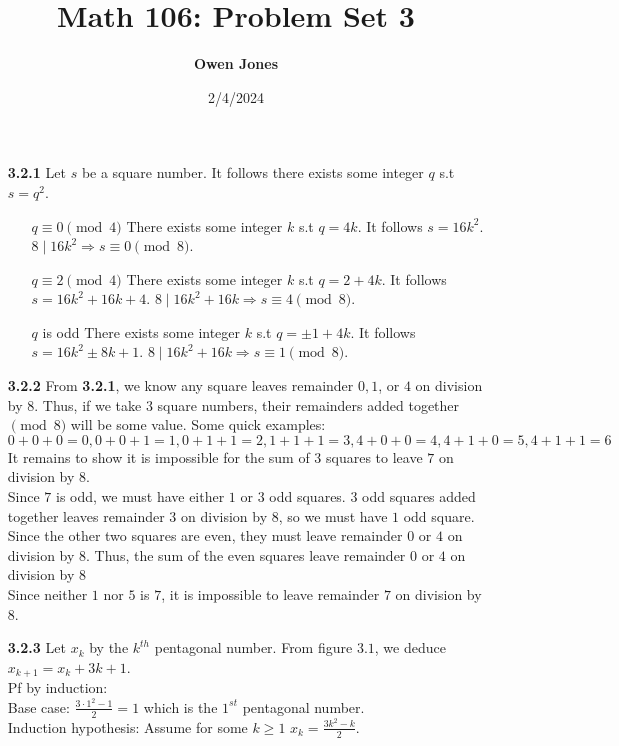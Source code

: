 \documentclass[10pt]{article}
\title{\bf Math 106: Problem Set 3}
\date{2/4/2024}
\author{\bf Owen Jones}
\begin{document}
\maketitle
\begin{enumerate}
    \item [\textbf{3.2.1}] Let $s$ be a square number.
    It follows there exists some integer $q$ s.t $s=q^2$.
    \begin{itemize}
        \item [$q\equiv 0\pmod{4}$] There exists some integer $k$ s.t $q=4k$. It follows $s=16k^2$. $8\mid 16k^2\Rightarrow s\equiv 0\pmod{8}$.
        \item [$q\equiv 2\pmod{4}$] There exists some integer $k$ s.t $q=2+4k$. It follows $s=16k^2+16k+4$. $8\mid 16k^2+16k\Rightarrow s\equiv 4\pmod{8}$.
        \item [$q$ is odd] There exists some integer $k$ s.t $q=\pm1+4k$. It follows $s=16k^2\pm8k+1$. $8\mid 16k^2+16k\Rightarrow s\equiv 1\pmod{8}$.
    \end{itemize}
    \item [\textbf{3.2.2}] From \textbf{3.2.1}, we know any square leaves remainder $0,1$, or $4$ on division by $8$. 
    Thus, if we take $3$ square numbers, their remainders added together $\pmod{8}$ will be some value. Some quick examples:\\
    $0+0+0=0,
    0+0+1=1,
    0+1+1=2,
    1+1+1=3,
    4+0+0=4,
    4+1+0=5,
    4+1+1=6$\\
    It remains to show it is impossible for the sum of $3$ squares to leave $7$ on division by $8$.\\
    Since $7$ is odd, we must have either $1$ or $3$ odd squares. 
    $3$ odd squares added together leaves remainder $3$ on division by $8$, so we must have $1$ odd square.
    Since the other two squares are even, they must leave remainder $0$ or $4$ on division by $8$.
    Thus, the sum of the even squares leave remainder $0$ or $4$ on division by $8$\\
    Since neither $1$ nor $5$ is $7$, it is impossible to leave remainder $7$ on division by $8$.
    \item [\textbf{3.2.3}] Let $x_k$ by the $k^{th}$ pentagonal number. From figure $3.1$, we deduce $x_{k+1}=x_k+3k+1$.\\
    Pf by induction:\\
    Base case: $\frac{3\cdot 1^2-1}{2}=1$ which is the $1^{st}$ pentagonal number.\\
    Induction hypothesis: Assume for some $k\ge 1$ $x_k=\frac{3k^2-k}{2}$.\\

\end{enumerate}
\end{document}

